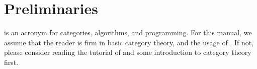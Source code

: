 \section{Preliminaries}
\CapPkg is an acronym for categories, algorithms, and programming. For this manual, we assume that the reader
is firm in basic category theory, and the usage of \GAP. If not, please consider reading the tutorial of \GAP and
some introduction to category theory first. 
